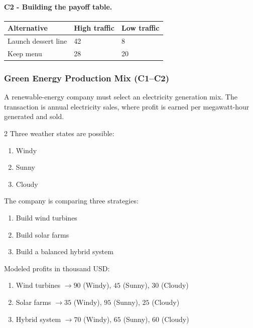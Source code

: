 
	\paragraph*{C2 - Building the payoff table.}
	\label{subsec:problem3-local-cafe-investment-c2}
	\begin{center}
		\begin{tabular}{lll}
			\toprule
			Alternative & High traffic & Low traffic \\
			\midrule
			Launch dessert line & 42 & 8 \\
			Keep menu & 28 & 20 \\
			\bottomrule
		\end{tabular}
	\end{center}


	\subsubsection{Green Energy Production Mix (C1--C2)}
	\label{sec:problem4-green-energy-production-mix-c1-c2}
	A renewable-energy company must select an electricity generation mix. The transaction is annual electricity sales, where profit is earned per megawatt-hour generated and sold.

	\begin{multicols}{2}
		Three weather states are possible:
		\begin{enumerate}[label=\arabic*.]
			\item Windy
			\item Sunny
			\item Cloudy
		\end{enumerate}

		The company is comparing three strategies:
		\begin{enumerate}[label=\arabic*.]
			\item Build wind turbines
			\item Build solar farms
			\item Build a balanced hybrid system
		\end{enumerate}

			\columnbreak

		Modeled profits in thousand USD:
		\begin{enumerate}[label=\arabic*.]
			\item Wind turbines $\to 90$ (Windy), $45$ (Sunny), $30$ (Cloudy)
			\item Solar farms $\to 35$ (Windy), $95$ (Sunny), $25$ (Cloudy)
			\item Hybrid system $\to 70$ (Windy), $65$ (Sunny), $60$ (Cloudy)
		\end{enumerate}
	\end{multicols}


